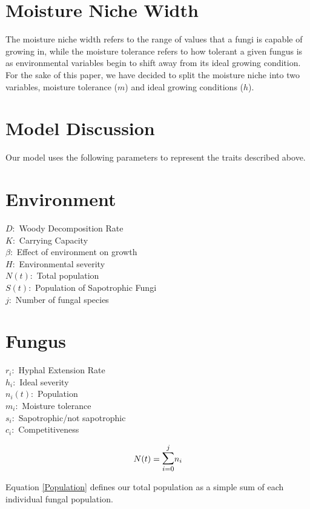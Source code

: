 \documentclass[twocolumn]{article} %
\begin{document}
\section{Moisture Niche Width}

The moisture niche width refers to the range of values that a fungi is capable of growing in, while the moisture tolerance refers to how tolerant a given fungus is as environmental variables begin to shift away from its ideal growing condition. For the sake of this paper, we have decided to split the moisture niche into two variables, moisture tolerance ($m$) and ideal growing conditions ($h$).


\section{Model Discussion}

\noindent Our model uses the following parameters to represent the traits described above.

\section*{Environment}
$ D: $ Woody Decomposition Rate\\
$ K: $ Carrying Capacity\\
$ \beta : $  Effect of environment on growth\\ 
$ H: $ Environmental severity\\
$ N(t): $ Total population \\
$ S(t): $ Population of Sapotrophic Fungi\\
$ j:  $ Number of fungal species

\section*{Fungus}
$ r_i: $ Hyphal Extension Rate\\
$ h_i: $ Ideal severity\\
$ n_i(t): $ Population\\
$ m_i: $ Moisture tolerance \\
$ s_i: $ Sapotrophic/not sapotrophic\\ 
$ c_i: $ Competitiveness


\begin{equation} \label{Population}
    N(t) = \mathlarger{\mathlarger{\sum}}_{i=0}^{j} n_i
\end{equation}

\noindent Equation \ref{Population} defines our total population as a simple sum of each individual fungal population.
\end{document}
